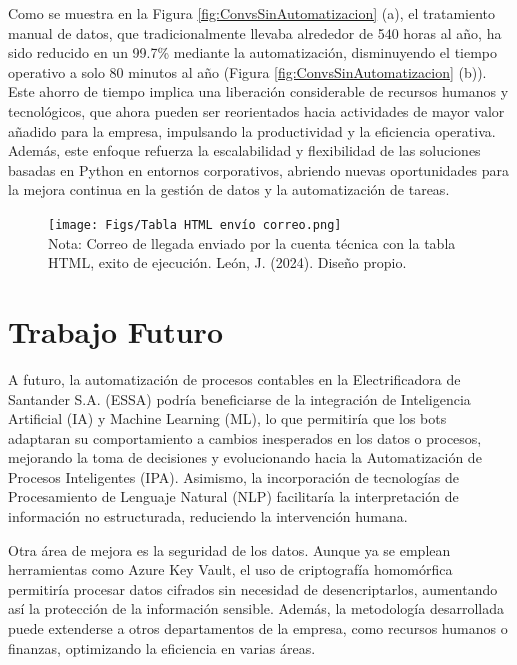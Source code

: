 \documentclass[letter,oneside,12pt,spanish]{report}
\begin{document}
\noindent Como se muestra en la Figura \ref{fig:ConvsSinAutomatizacion} (a), el tratamiento manual de datos, que tradicionalmente llevaba alrededor de 540 horas al año, ha sido reducido en un 99.7\% mediante la automatización, disminuyendo el tiempo operativo a solo 80 minutos al año (Figura \ref{fig:ConvsSinAutomatizacion} (b)). Este ahorro de tiempo implica una liberación considerable de recursos humanos y tecnológicos, que ahora pueden ser reorientados hacia actividades de mayor valor añadido para la empresa, impulsando la productividad y la eficiencia operativa. Además, este enfoque refuerza la escalabilidad y flexibilidad de las soluciones basadas en Python en entornos corporativos, abriendo nuevas oportunidades para la mejora continua en la gestión de datos y la automatización de tareas.



\begin{figure}[ht]
    \centering
    \texttt{[image: Figs/Tabla HTML envío correo.png]}
    \label{fig:HTMLSend}
    \\Nota: Correo de llegada enviado por la cuenta técnica con la tabla HTML, exito de ejecución. León, J. (2024). Diseño propio.
\end{figure} 




\newpage

\section{Trabajo Futuro}

\noindent A futuro, la automatización de procesos contables en la Electrificadora de Santander S.A. (ESSA) podría beneficiarse de la integración de Inteligencia Artificial (IA) y Machine Learning (ML), lo que permitiría que los bots adaptaran su comportamiento a cambios inesperados en los datos o procesos, mejorando la toma de decisiones y evolucionando hacia la Automatización de Procesos Inteligentes (IPA). Asimismo, la incorporación de tecnologías de Procesamiento de Lenguaje Natural (NLP) facilitaría la interpretación de información no estructurada, reduciendo la intervención humana.

\noindent Otra área de mejora es la seguridad de los datos. Aunque ya se emplean herramientas como Azure Key Vault, el uso de criptografía homomórfica permitiría procesar datos cifrados sin necesidad de desencriptarlos, aumentando así la protección de la información sensible. Además, la metodología desarrollada puede extenderse a otros departamentos de la empresa, como recursos humanos o finanzas, optimizando la eficiencia en varias áreas.
\end{document}
